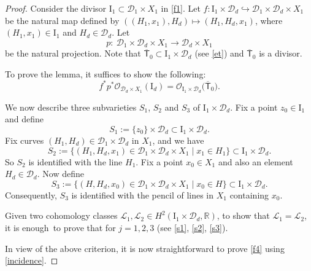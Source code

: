\documentclass[11pt]{article}
\numberwithin{equation}{section}
\begin{document}
\begin{proof}
Consider the divisor $\mathrm{I}_1  \subset \mathcal{D}_1\times X_1$ in \eqref{f1}.
Let
$
f \colon  \mathrm{I}_1\times \mathcal{D}_d  \hookrightarrow  \mathcal{D}_1 \times \mathcal{D}_d \times X_1$
be the natural map defined by $((H_1, x_1), H_d) \longmapsto (H_1, H_d, x_1)$, where
$(H_1, x_1) \in \mathrm{I}_1$ and $H_d \in \mathcal{D}_d$. Let
\begin{equation}\label{f3}
p \colon\ \mathcal{D}_1 \times \mathcal{D}_d \times X_1 \longrightarrow
\mathcal{D}_d \times X_1
\end{equation}
be the natural projection. Note that
$
\overline{\mathsf{T}}_0 \subset \mathrm{I}_1\times \mathcal{D}_d
$
(see \eqref{et}) and $\overline{\mathsf{T}}_0$ is a divisor.

To prove the lemma, it suffices to show the following:
\begin{equation}\label{f4}
f^*p^* {\mathcal O}_{\mathcal{D}_d \times X_1}(\mathrm{I}_d) =
{\mathcal O}_{\mathrm{I}_1\times \mathcal{D}_d}\bigl(\overline{\mathsf{T}}_0\bigr).
\end{equation}

We now describe three subvarieties $S_1$, $S_2$ and $S_3$ of $\mathrm{I}_1\times \mathcal{D}_d$. Fix
a point $z_0 \in \mathrm{I}_1$ and define%
\begin{equation}\label{s1}
S_1 := \{z_0\}\times\mathcal{D}_d \subset \mathrm{I}_1\times \mathcal{D}_d.
\end{equation}
Fix curves $(H_1, H_d) \in \mathcal{D}_1 \times \mathcal{D}_d$ in $X_1$, and we have
\begin{equation}\label{s2}
S_2 := \{(H_1, H_d, x_1) \in \mathcal{D}_1 \times \mathcal{D}_d \times X_1
  \mid  x_1 \in H_1\} \subset \mathrm{I}_1\times \mathcal{D}_d.
\end{equation}
So $S_2$ is identified with the line $H_1$. Fix a point $x_0 \in X_1$ and also an
element $H_d \in \mathcal{D}_d$. Now define
\begin{equation}\label{s3}
S_3 := \{(H, H_d, x_0) \in \mathcal{D}_1 \times \mathcal{D}_d \times X_1  \mid
x_0 \in H\} \subset \mathrm{I}_1\times \mathcal{D}_d.
\end{equation}
Consequently, $S_3$ is identified with the pencil of lines in $X_1$ containing $x_0$.

Given two cohomology classes ${\mathcal L}_1, {\mathcal L}_2  \in H^2(\mathrm{I}_1\times \mathcal{D}_d,
{\mathbb R})$, to show that
${\mathcal L}_1 = {\mathcal L}_2$, it is enough~to prove that
for $j = 1, 2, 3$ (see \eqref{s1}, \eqref{s2}, \eqref{s3}).

In view of the above criterion, it is now straightforward to prove \eqref{f4} using \eqref{incidence}.
\end{proof}
\end{document}
